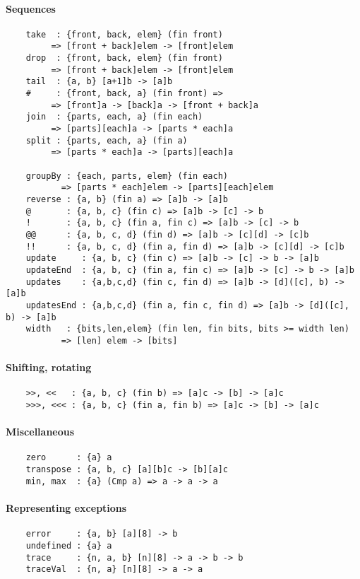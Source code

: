 \paragraph*{Sequences}
\begin{Verbatim}
    take  : {front, back, elem} (fin front)
         => [front + back]elem -> [front]elem
    drop  : {front, back, elem} (fin front)
         => [front + back]elem -> [front]elem
    tail  : {a, b} [a+1]b -> [a]b
    #     : {front, back, a} (fin front) =>
         => [front]a -> [back]a -> [front + back]a
    join  : {parts, each, a} (fin each)
         => [parts][each]a -> [parts * each]a
    split : {parts, each, a} (fin a)
         => [parts * each]a -> [parts][each]a

    groupBy : {each, parts, elem} (fin each)
           => [parts * each]elem -> [parts][each]elem
    reverse : {a, b} (fin a) => [a]b -> [a]b
    @       : {a, b, c} (fin c) => [a]b -> [c] -> b
    !       : {a, b, c} (fin a, fin c) => [a]b -> [c] -> b
    @@      : {a, b, c, d} (fin d) => [a]b -> [c][d] -> [c]b
    !!      : {a, b, c, d} (fin a, fin d) => [a]b -> [c][d] -> [c]b
    update     : {a, b, c} (fin c) => [a]b -> [c] -> b -> [a]b
    updateEnd  : {a, b, c} (fin a, fin c) => [a]b -> [c] -> b -> [a]b
    updates    : {a,b,c,d} (fin c, fin d) => [a]b -> [d]([c], b) -> [a]b
    updatesEnd : {a,b,c,d} (fin a, fin c, fin d) => [a]b -> [d]([c], b) -> [a]b
    width   : {bits,len,elem} (fin len, fin bits, bits >= width len)
           => [len] elem -> [bits]
\end{Verbatim}
\paragraph*{Shifting, rotating}
\begin{Verbatim}
    >>, <<   : {a, b, c} (fin b) => [a]c -> [b] -> [a]c
    >>>, <<< : {a, b, c} (fin a, fin b) => [a]c -> [b] -> [a]c
\end{Verbatim}
\paragraph*{Miscellaneous}
\begin{Verbatim}
    zero      : {a} a
    transpose : {a, b, c} [a][b]c -> [b][a]c
    min, max  : {a} (Cmp a) => a -> a -> a
\end{Verbatim}
\paragraph*{Representing exceptions}
\begin{Verbatim}
    error     : {a, b} [a][8] -> b
    undefined : {a} a
    trace     : {n, a, b} [n][8] -> a -> b -> b
    traceVal  : {n, a} [n][8] -> a -> a
\end{Verbatim}

